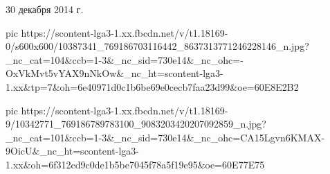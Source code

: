 30 декабря 2014 г.

\ifcmt
  pic https://scontent-lga3-1.xx.fbcdn.net/v/t1.18169-0/s600x600/10387341_769186703116442_8637313771246228146_n.jpg?_nc_cat=104&ccb=1-3&_nc_sid=730e14&_nc_ohc=-OxVkMvt5vYAX9nNkOw&_nc_ht=scontent-lga3-1.xx&tp=7&oh=6e40971d0c1b6be69e0cecb7faa23d99&oe=60E8E2B2
\fi

\ifcmt
  pic https://scontent-lga3-1.xx.fbcdn.net/v/t1.18169-9/10342771_769186789783100_9083203420207092859_n.jpg?_nc_cat=101&ccb=1-3&_nc_sid=730e14&_nc_ohc=CA15Lgvn6KMAX-9OicU&_nc_ht=scontent-lga3-1.xx&oh=6f312cd9c0de1b5be7045f78a5f19e95&oe=60E77E75
\fi
